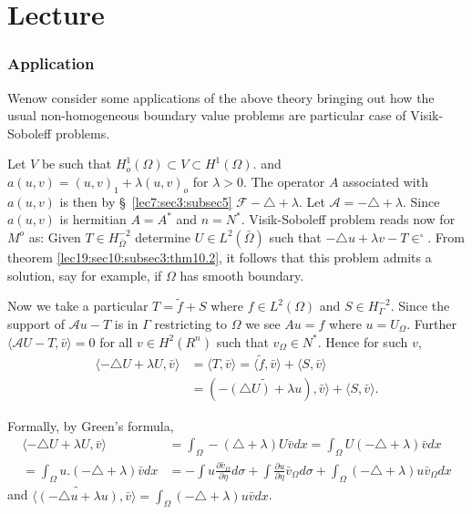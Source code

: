 
\chapter{Lecture}\label{lec20}
\setcounter{section}{10}

\subsection{Application}\label{lec20:sec10:subsec4}

We\pageoriginale now consider some applications of the above theory bringing out how
the usual non-homogeneous boundary value problems are particular case
of Visik-Soboleff problems.  

Let $V$ be such that $H^1_o (\Omega) \subset V \subset H^1
(\Omega)$. and $a(u, v) = (u, v)_1 + \lambda (u, v)_o$ for $\lambda >
0$. The operator $A$ associated with $a(u, v)$ is then by \S\ \ref{lec7:sec3:subsec5}
 $\mathcal{F} - \triangle + \lambda$. Let $\mathscr{A} = - \triangle +
\lambda$. Since $a(u, v)$ is hermitian $A = A^*$ and $n =
N^*$. Visik-Soboleff problem reads now for $M^o$ as: Given $T
\in H^{-2}_{\bar{\Omega}}$ determine $U \in L^2
(\bar{\Omega})$ such that $ - \triangle u + \lambda v - T \in
^\circ$. From theorem \ref{lec19:sec10:subsec3:thm10.2}, it follows that this problem admits a
solution, say for example, if $\Omega$ has smooth boundary.  

Now we take a particular $T = \tilde{f} + S$ where $f \in L^2
(\Omega)$ and $S \in H^{-2}_\Gamma$. Since the support of
$\mathscr{A}u - T$ is in $\Gamma$ restricting to $\Omega$ we see $Au =
f$ where $u = U_\Omega$. Further $\langle \mathscr{A} U - T, \bar{v}
\rangle = 0$ for all $v \in H^2 (R^n)$ such that $v_\Omega
\in N^*$. Hence for such $v$,  
\begin{align*}
  \langle - \triangle U + \lambda U, \bar{v} \rangle & = \langle T,
  \bar{v} \rangle = \langle \tilde{f}, \bar{v} \rangle + \langle S,
  \bar{v} \rangle\\ 
  & = (- \widetilde{(\triangle U) + \lambda u}), \bar{v}	 \rangle +
  \langle S, \bar{v} \rangle.  
\end{align*}

Formally, by Green's formula, 
\begin{align*}
  \langle - \triangle U + \lambda U, \bar{v} \rangle & = \int_\Omega -
  (\triangle + \lambda) U \bar{v} dx = \int_\Omega U(- \triangle +
  \lambda ) \bar{v} dx\\ 
  = \int_\Omega u. (- \triangle + \lambda ) \bar{v} dx & = - \int u
  \frac{\partial \bar{v}_\Omega}{\partial \eta} d \sigma +
  \int \frac{\partial u}{\partial \eta} \bar{v}_\Omega d \sigma +
  \int_\Omega (- \triangle + \lambda ) u \bar{v}_\Omega dx 
\end{align*}
and $\langle \widetilde{(- \triangle u + \lambda u)}, \bar{v} \rangle =
\int_\Omega (- \triangle + \lambda ) u \bar{v} dx$.  

